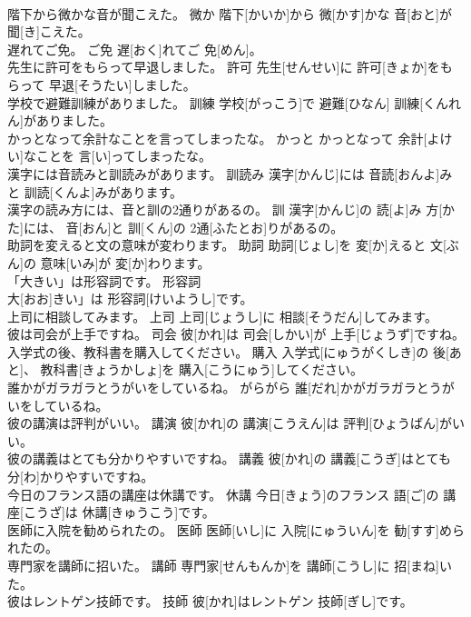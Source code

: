 \documentclass[8pt]{extreport}
\begin{document}
\begin{CJK}{UTF8}{min}
\\	階下から微かな音が聞こえた。	微か	階下[かいか]から 微[かす]かな 音[おと]が 聞[き]こえた。	
\\	遅れてご免。	ご免	遅[おく]れてご 免[めん]。	
\\	先生に許可をもらって早退しました。	許可	先生[せんせい]に 許可[きょか]をもらって 早退[そうたい]しました。	
\\	学校で避難訓練がありました。	訓練	学校[がっこう]で 避難[ひなん] 訓練[くんれん]がありました。	
\\	かっとなって余計なことを言ってしまったな。	かっと	かっとなって 余計[よけい]なことを 言[い]ってしまったな。	
\\	漢字には音読みと訓読みがあります。	訓読み	漢字[かんじ]には 音読[おんよ]みと 訓読[くんよ]みがあります。	
\\	漢字の読み方には、音と訓の2通りがあるの。	訓	漢字[かんじ]の 読[よ]み 方[かた]には、 音[おん]と 訓[くん]の 2通[ふたとお]りがあるの。	
\\	助詞を変えると文の意味が変わります。	助詞	助詞[じょし]を 変[か]えると 文[ぶん]の 意味[いみ]が 変[か]わります。	
\\	「大きい」は形容詞です。	形容詞	
\\	大[おお]きい」は 形容詞[けいようし]です。	
\\	上司に相談してみます。	上司	上司[じょうし]に 相談[そうだん]してみます。	
\\	彼は司会が上手ですね。	司会	彼[かれ]は 司会[しかい]が 上手[じょうず]ですね。	
\\	入学式の後、教科書を購入してください。	購入	入学式[にゅうがくしき]の 後[あと]、 教科書[きょうかしょ]を 購入[こうにゅう]してください。	
\\	誰かがガラガラとうがいをしているね。	がらがら	誰[だれ]かがガラガラとうがいをしているね。	
\\	彼の講演は評判がいい。	講演	彼[かれ]の 講演[こうえん]は 評判[ひょうばん]がいい。	
\\	彼の講義はとても分かりやすいですね。	講義	彼[かれ]の 講義[こうぎ]はとても 分[わ]かりやすいですね。	
\\	今日のフランス語の講座は休講です。	休講	今日[きょう]のフランス 語[ご]の 講座[こうざ]は 休講[きゅうこう]です。	
\\	医師に入院を勧められたの。	医師	医師[いし]に 入院[にゅういん]を 勧[すす]められたの。	
\\	専門家を講師に招いた。	講師	専門家[せんもんか]を 講師[こうし]に 招[まね]いた。	
\\	彼はレントゲン技師です。	技師	彼[かれ]はレントゲン 技師[ぎし]です。	

\end{CJK}
\end{document}
